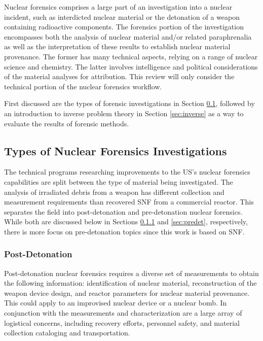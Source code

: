 Nuclear forensics comprises a large part of an investigation into a nuclear
incident, such as interdicted nuclear material or the detonation of a weapon
containing radioactive components.  The forensics portion of the investigation
encompasses both the analysis of nuclear material and/or related paraphrenalia
as well as the interpretation of these results to establish nuclear material
provenance. The former has many technical aspects, relying on a range of
nuclear science and chemistry.  The latter involves intelligence and political
considerations of the material analyses for attribution. This review will only
consider the technical portion of the nuclear forensics workflow.

First discussed are the types of forensic investigations in Section
\ref{sec:types}, followed by an introduction to inverse problem theory in
Section \ref{sec:inverse} as a way to evaluate the results of forensic methods. 

\subsection{Types of Nuclear Forensics Investigations}
\label{sec:types}

The technical programs researching improvements to the \gls{US}'s nuclear
forensics capabilities are split between the type of material being
investigated. The analysis of irradiated debris from a weapon has different
collection and measurement requirements than recovered \gls{SNF} from a
commercial reactor. This separates the field into post-detonation and
pre-detonation nuclear forensics. While both are discussed below in Sections
\ref{sec:postdet} and \ref{sec:predet}, respectively, there is more focus on
pre-detonation topics since this work is based on \gls{SNF}.

\subsubsection{Post-Detonation}
\label{sec:postdet}

Post-detonation nuclear forensics requires a diverse set of measurements to
obtain the following information: identification of nuclear material,
reconstruction of the weapon device design, and reactor parameters for nuclear
material provenance. This could apply to an improvised nuclear device or a
nuclear bomb.  In conjunction with the measurements and characterization are a
large array of logistical concerns, including recovery efforts, personnel
safety, and material collection cataloging and transportation.

